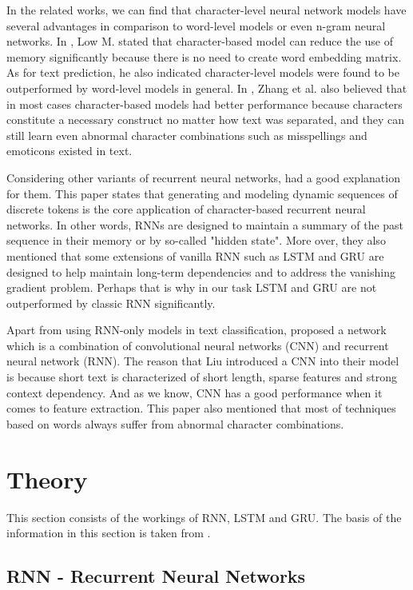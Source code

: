 \documentclass[runningheads]{llncs}
\begin{document}
In the related works, we can find that character-level neural network models have several advantages in comparison to word-level models or even n-gram neural networks. In \cite{low2016character}, Low M. stated that character-based model can reduce the use of memory significantly because there is no need to create word embedding matrix\cite{kim2016character}. As for text prediction, he also indicated character-level models were found to be outperformed by word-level models in general. In \cite{zhang2015character}, Zhang et al. also believed that in most cases character-based models had better performance because characters constitute a necessary construct no matter how text was separated, and they can still learn even abnormal character combinations such as misspellings and emoticons existed in text.    

Considering other variants of recurrent neural networks, \cite{de2018character} had a good explanation for them. This paper states that generating and modeling dynamic sequences of discrete tokens is the core application of character-based recurrent neural networks. In other words, RNNs are designed to maintain a summary of the past sequence in their memory or by so-called "hidden state". More over, they also mentioned that some extensions of vanilla RNN such as LSTM and GRU are designed to help maintain long-term dependencies and to address the vanishing gradient problem. Perhaps that is why in our task LSTM and GRU are not outperformed by classic RNN significantly. 

Apart from using RNN-only models in text classification, \cite{liu2017character} proposed a network which is a combination of convolutional neural networks (CNN) and recurrent neural network (RNN). The reason that Liu introduced a CNN into their model is because short text is characterized of short length, sparse features and strong context dependency. And as we know, CNN has a good performance when it comes to feature extraction. This paper also mentioned that most of techniques based on words always suffer from abnormal character combinations.   

\section{Theory}

This section consists of the workings of RNN, LSTM and GRU. The basis of the information in this section is taken from \cite{colah}.
 
\subsection{RNN - Recurrent Neural Networks}
\end{document}
